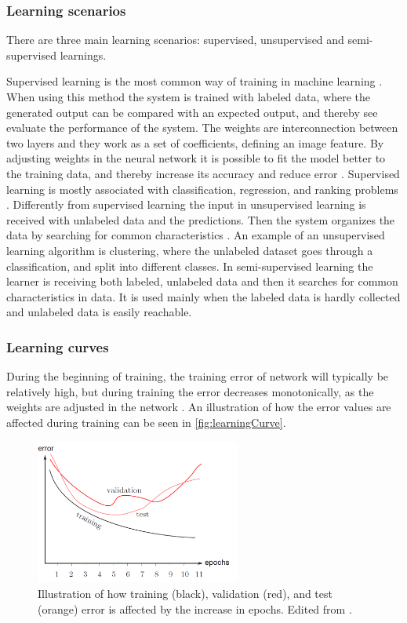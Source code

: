 \subsubsection{Learning scenarios}
There are three main learning scenarios: supervised, unsupervised and semi-supervised learnings.

Supervised learning is the most common way of training in machine learning \citep{LeCun2015}. When using this method the system is trained with labeled data, where the generated output can be compared with an expected output, and thereby see evaluate the performance of the system. The weights are interconnection between two layers and they work as a set of coefficients, defining an image feature.\citep{Hameed2016} By adjusting weights in the neural network it is possible to fit the model better to the training data, and thereby increase its accuracy and reduce error \citep{LeCun2015}. Supervised learning is mostly associated with classification, regression, and ranking problems \citep{Mehryar2012}.
\noindent
Differently from supervised learning the input in unsupervised learning is received with unlabeled data and the predictions. Then the system organizes the data by searching for common characteristics \citep{Mehryar2012}. An example of an unsupervised learning algorithm is clustering, where the unlabeled dataset goes through a classification, and split into different classes.\citep{Goodfellow2016} 
\noindent
In semi-supervised learning the learner is receiving both labeled, unlabeled data and then it searches for common characteristics in data. It is used mainly when the labeled data is hardly collected and unlabeled data is easily reachable.\citep{Mehryar2012}


\subsubsection{Learning curves}
During the beginning of training, the training error of network will typically be relatively high, but during training the error decreases monotonically, as the weights are adjusted in the network \citep{Duda2000}. An illustration of how the error values are affected during training can be seen in \autoref{fig:learningCurve}.

\begin{figure} [H]
\centering
\includegraphics[width=0.6\textwidth]{figures/learningCurves}
\caption{Illustration of how training (black), validation (red), and test (orange) error is affected by the increase in epochs. Edited from \citep{Duda2000}.}
\label{fig:learningCurve}
\end{figure}

